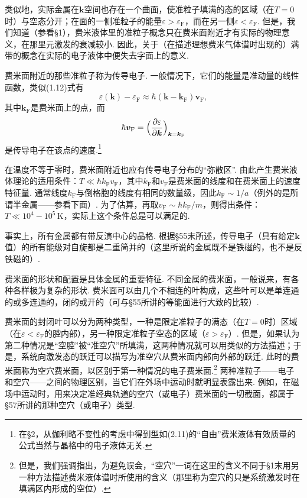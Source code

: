 类似地，实际金属在$\bm k$空间也存在一个曲面，使准粒子填满的态的区域（在$T=0$时）与空态分开；在面的一侧准粒子的能量$\varepsilon>\varepsilon_{\mathrm F}$，而在另一侧$\varepsilon<\varepsilon_{\mathrm F}$. 但是，我们知道（参看§1），费米液体里的准粒子概念只在费米面附近才有实际的物理意义，在那里元激发的衰减较小. 因此，关于（在描述理想费米气体谱时出现的）满带的概念在实际的电子液体中便失去字面上的意义.

费米面附近的那些准粒子称为传导电子. 一般情况下，它们的能量是准动量的线性函数，类似(1.12)式有
\begin{equation}
\varepsilon(\bm k)-\varepsilon_{\mathrm F}\approx\hbar(\bm k-\bm k_{\mathrm F})\bm v_{\mathrm F},
\label{61.2}
\end{equation}
其中$\bm k_{\mathrm F}$是费米面上的点，而
\begin{equation}
\hbar\bm v_{\mathrm F}=\Bigl(\frac{\partial\varepsilon}{\partial\bm k}\Bigr)_{\bm k=\bm k_{\mathrm F}}
\label{61.3}
\end{equation}
是传导电子在该点的速度.\footnote{在§2，从伽利略不变性的考虑中得到型如(2.11)的“自由”费米液体有效质量的公式当然与晶格中的电子液体无关.}

在温度不等于零时，费米面附近也应有传导电子分布的“弥散区”. 由此产生费米液体理论的适用条件：$T\ll\hbar k_{\mathrm F}v_{\mathrm F}$，其中$k_{\mathrm F}$和$v_{\mathrm F}$是费米面的线度和在费米面上的速度特征量. 通常线度$k_{\mathrm F}$与倒格胞的线度有相同的数量级，因此$k_{\mathrm F}\sim1/a$（例外的是所谓半金属——参看下面）. 为了估算，再取$v_{\mathrm F}\sim\hbar k_{\mathrm F}/m$，则得出条件：$T\ll10^4-10^5\,\mathrm K$，实际上这个条件总是可以满足的.

事实上，所有金属都有带反演中心的晶格. 根据§55末所述，传导电子（具有给定$\bm k$值）的所有能级对自旋都是二重简并的（这里所说的金属既不是铁磁的，也不是反铁磁的）.

费米面的形状和配置是具体金属的重要特征. 不同金属的费米面，一般说来，有各种各样极为复杂的形状. 费米面可以由几个不相连的叶构成，这些叶可以是单连通的或多连通的，闭的或开的（可与§55所讲的等能面进行大致的比较）.

费米面的封闭叶可以分为两种类型，一种是限定准粒子的满态（在$T=0$时）区域（在$\varepsilon<\varepsilon_{\mathrm F}$的腔内部），另一种限定准粒子空态的区域（$\varepsilon>\varepsilon_{\mathrm F}$）. 但是，如果认为第二种情况是“空腔”被“准空穴”所填满，这两种情况就可以用类似的方法描述；于是，系统向激发态的跃迁可以描写为准空穴从费米面内部向外部的跃迁. 此时的费米面称为空穴费米面，以区别于第一种情况的电子费米面.\footnote{但是，我们强调指出，为避免误会，“空穴”一词在这里的含义不同于§1末用另一种方法描述费米液体谱时所使用的含义（那里称为空穴的只是系统激发时在填满区内形成的空位）.} 两种准粒子——电子和空穴——之间的物理区别，当它们在外场中运动时就明显表露出来. 例如，在磁场中运动时，用来决定准经典轨道的空穴（或电子）费米面的一切截面，都属于§57所讲的那种空穴（或电子）类型.


